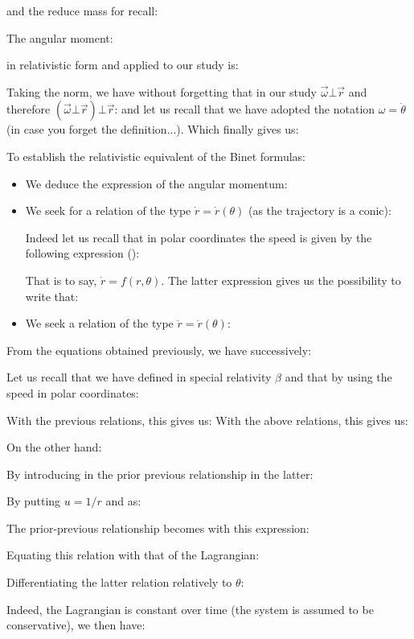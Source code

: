 	and the reduce mass for recall:
	
	The angular moment:
	
	in relativistic form and applied to our study is:
	
	Taking the norm, we have without forgetting that in our study $\vec{\omega}\bot\vec{r}$ and therefore $(\vec{\omega}\bot\vec{r})\bot\vec{r}$: and let us recall that we have adopted the notation $\omega=\dot{\theta}$ (in case you forget the definition...). Which finally gives us:
	
	To establish the relativistic equivalent of the Binet formulas:
	\begin{itemize}
		\item We deduce the expression of the angular momentum:
		

		\item We seek for a relation of the type $\dot{r}=\dot{r}(\theta)$ (as the trajectory is a conic):
		
		Indeed let us recall that in polar coordinates the speed is given by the following expression ():
		
		That is to say, $\dot{r}=f(r,\theta)$. The latter expression gives us the possibility to write that:
		
		
		\item We seek a relation of the type $\ddot{r}=\ddot{r}(\theta)$:
		
	\end{itemize}
	From the equations obtained previously, we have successively:
	
	Let us recall that we have defined in special relativity $\beta$ and that by using the speed in polar coordinates:
	
	With the previous relations, this gives us:
	With the above relations, this gives us:
	
	On the other hand:
	
	By introducing in the prior previous relationship in the latter:
	
	By putting $u=1/r$ and as:
	
	The prior-previous relationship becomes with this expression:
	
	Equating this relation with that of the Lagrangian:
	
	Differentiating the latter relation relatively to $\theta$:
	
	Indeed, the Lagrangian is constant over time (the system is assumed to be conservative), we then have:
	
